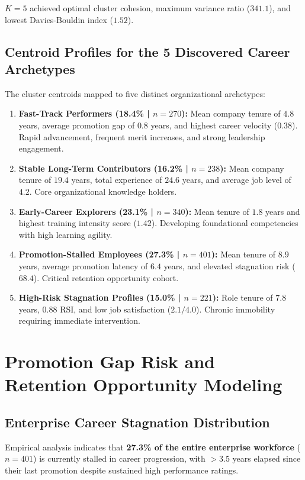 \documentclass[12pt,a4paper,oneside]{article}
\begin{document}
$K=5$ achieved optimal cluster cohesion, maximum variance ratio ($341.1$), and lowest Davies-Bouldin index ($1.52$).

\subsection{Centroid Profiles for the 5 Discovered Career Archetypes}
The cluster centroids mapped to five distinct organizational archetypes:
\begin{enumerate}
  \item \textbf{Fast-Track Performers (18.4\% | $n=270$):} Mean company tenure of $4.8$ years, average promotion gap of $0.8$ years, and highest career velocity ($0.38$). Rapid advancement, frequent merit increases, and strong leadership engagement.
  \item \textbf{Stable Long-Term Contributors (16.2\% | $n=238$):} Mean company tenure of $19.4$ years, total experience of $24.6$ years, and average job level of $4.2$. Core organizational knowledge holders.
  \item \textbf{Early-Career Explorers (23.1\% | $n=340$):} Mean tenure of $1.8$ years and highest training intensity score ($1.42$). Developing foundational competencies with high learning agility.
  \item \textbf{Promotion-Stalled Employees (27.3\% | $n=401$):} Mean tenure of $8.9$ years, average promotion latency of $6.4$ years, and elevated stagnation risk ($68.4$). Critical retention opportunity cohort.
  \item \textbf{High-Risk Stagnation Profiles (15.0\% | $n=221$):} Role tenure of $7.8$ years, $0.88$ RSI, and low job satisfaction ($2.1/4.0$). Chronic immobility requiring immediate intervention.
\end{enumerate}

\section{Promotion Gap Risk and Retention Opportunity Modeling}

\subsection{Enterprise Career Stagnation Distribution}
Empirical analysis indicates that \textbf{27.3\% of the entire enterprise workforce} ($n=401$) is currently stalled in career progression, with $>3.5$ years elapsed since their last promotion despite sustained high performance ratings.
\end{document}
